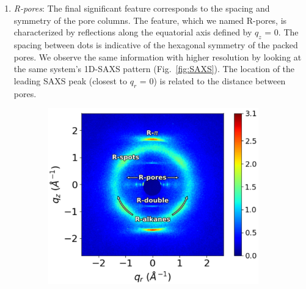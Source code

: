 \documentclass[journal=jpcbfk,manuscript=article]{achemso}
\begin{document}
\begin{enumerate}
	\item \textit{R-pores}: The final significant feature corresponds to the spacing
	and symmetry of the pore columns. The feature, which we named R-pores,
	is characterized by reflections along the equatorial axis defined by $q_z$ = 0.
	The spacing between dots is indicative of the hexagonal symmetry of the packed
	pores. We observe the same information with higher resolution by looking at the
	same system's 1D-SAXS pattern (Fig.~\ref{fig:SAXS}). The location of the
	leading SAXS peak (closest to $q_r$ = 0) is related to the distance between
	pores.
	
  \end{enumerate}

  \begin{figure}[!htb]
        \centering
                \begin{subfigure}[t]{0.495\linewidth}
                \centering
                \includegraphics[width=\linewidth]{WAXS_annotated_words.pdf} 
                \caption{}\label{fig:WAXS}
        \end{subfigure}
	\begin{subfigure}[t]{0.38\linewidth}
                \centering

\end{subfigure}
\end{figure}
\end{document}
